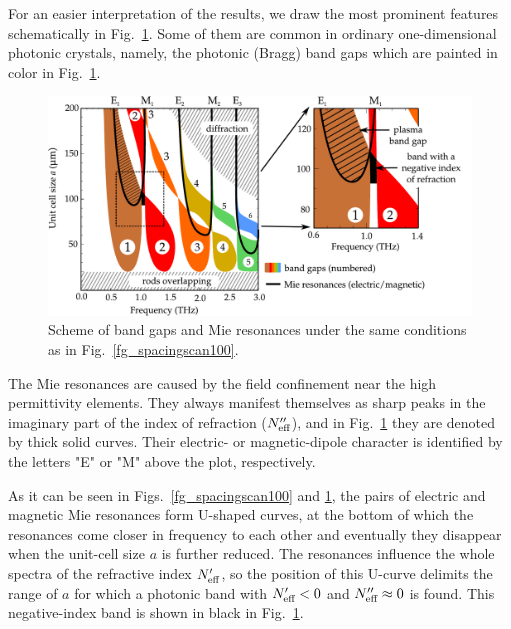 For an easier interpretation of the results, we draw the most prominent features schematically in Fig.~\ref{fg_drawn100}. Some of them are common in ordinary one-dimensional photonic crystals, namely, the photonic (Bragg) band gaps which are painted in color in Fig.~\ref{fg_drawn100}.

\begin{figure}
    \includegraphics[width=15cm]{img/ERods_eps100_spacingscan_drawn_bands.pdf}
    \caption{Scheme of band gaps and Mie resonances under the same conditions as
    in Fig.~\ref{fg_spacingscan100}.}
\label{fg_drawn100}
\end{figure}




The Mie resonances are caused by the field confinement near the high permittivity elements. They always manifest themselves as sharp peaks in the imaginary part of the index of refraction ($N_{\text{eff} }''$), and in Fig.~\ref{fg_drawn100} they are denoted by thick solid curves. Their electric- or magnetic-dipole character is identified by the letters "E" or "M" above the plot, respectively.

As it can be seen in Figs.~\ref{fg_spacingscan100} and \ref{fg_drawn100}, the pairs of electric and magnetic Mie resonances form U-shaped curves, at the bottom of which the resonances come closer in frequency to each other and eventually they disappear when the unit-cell size $a$ is further reduced. The resonances influence the whole spectra of the refractive index $N_{\text{eff} }'$, so the position of this U-curve delimits the range of $a$ for which a photonic band with $N_{\text{eff} }' < 0$ and $N_{\text{eff} }'' \approx 0$ is found. This negative-index band is shown in black in Fig.~\ref{fg_drawn100}.

